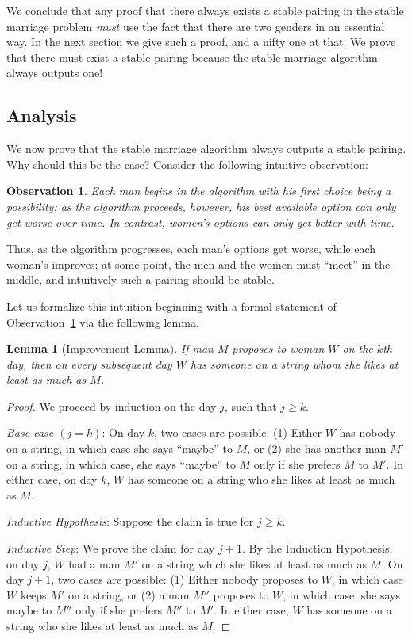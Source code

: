 \documentclass[11pt,fleqn]{article}
\newcounter{thm}
\newtheorem{lemma}{Lemma}[thm]
\newtheorem{observation}{Observation}[thm]
\begin{document}

We conclude that any proof that there always exists a stable pairing in the stable marriage problem \emph{must} use the fact that there are two genders
in an essential way. In the next section we give such a proof, and a nifty one at that: We prove that there must exist a stable pairing because the stable marriage algorithm always outputs one!

\subsection{Analysis}\label{sscn:analysis}

We now prove that the stable marriage algorithm always outputs a stable pairing. Why should this be the case? Consider the following intuitive observation:

\begin{observation}\label{obs:worsebetter}
    Each man begins in the algorithm with his first choice being a possibility; as the algorithm proceeds, however, his best available option can only get \emph{worse} over time. In contrast, women's options can only get \emph{better} with time.
\end{observation}

Thus, as the algorithm progresses, each man's options get worse, while each woman's improves; at some point, the men and the women must ``meet'' in the middle, and intuitively such a pairing should be stable.

Let us formalize this intuition beginning with a formal statement of Observation~\ref{obs:worsebetter} via the following lemma.

\begin{lemma}[Improvement Lemma]\label{l:improve}
If man $M$ proposes to woman $W$ on the $k$th day, then on every subsequent day $W$ has someone on a string whom she likes at least as much as $M$.
\end{lemma}
\begin{proof}
We proceed by induction on the day $j$, such that $j\geq k$.

\emph{Base case $(j=k)$}: On day $k$, two cases are possible: (1) Either $W$ has nobody on a string, in which case she says ``maybe'' to $M$, or (2) she has another man $M'$ on a string, in which case, she says ``maybe'' to $M$ only if she prefers $M$ to $M'$. In either case, on day $k$, $W$ has someone on a string who she likes at least as much as $M$.

\emph{Inductive Hypothesis}: Suppose the claim is true for $j\geq k$.

\emph{Inductive Step}: We prove the claim for day $j+1$. By the Induction Hypothesis, on day $j$, $W$ had a man $M'$ on a string which she likes at least as much as $M$. On day $j+1$, two cases are possible: (1) Either nobody proposes to $W$, in which case $W$ keeps $M'$ on a string, or (2) a man $M''$ proposes to $W$, in which case, she says maybe to $M''$ only if she prefers $M''$ to $M'$. In either case, $W$ has someone on a string who she likes at least as much as $M$.
\end{proof}
\end{document}
